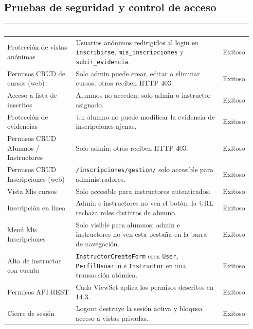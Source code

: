 \documentclass[11pt,letterpaper]{article}
\newcommand{\headrowcolor}{\rowcolor{azulUAZ}}
\newcommand{\headcell}[1]{\textcolor{white}{\textbf{#1}}}
\begin{document}
	\subsection{Pruebas de seguridad y control de acceso}
	\begin{center}\small
		\begin{tabularx}{\linewidth}{|p{4.2cm}|X|c|}
			\hline
			\headrowcolor \headcell{Caso} & \headcell{Resultado esperado} & \headcell{Estado} \\ \hline
			Protecci\'on de vistas an\'onimas & Usuarios an\'onimos redirigidos al login en \texttt{inscribirse}, \texttt{mis\_inscripciones} y \texttt{subir\_evidencia}. & Exitoso \\ \hline
			\rowcolor{grisAlt}
			Permisos CRUD de cursos (web) & Solo admin puede crear, editar o eliminar cursos; otros reciben HTTP 403. & Exitoso \\ \hline
			Acceso a lista de inscritos & Alumnos no acceden; solo admin o instructor asignado. & Exitoso \\ \hline
			\rowcolor{grisAlt}
			Protecci\'on de evidencias & Un alumno no puede modificar la evidencia de inscripciones ajenas. & Exitoso \\ \hline
			Permisos CRUD Alumnos / Instructores & Solo admin; otros reciben HTTP 403. & Exitoso \\ \hline
			\rowcolor{grisAlt}
			Permisos CRUD Inscripciones (web) & \texttt{/inscripciones/gestion/} solo accesible para administradores. & Exitoso \\ \hline
			Vista Mis cursos & Solo accesible para instructores autenticados. & Exitoso \\ \hline
			\rowcolor{grisAlt}
			Inscripci\'on en l\'inea & Admin e instructores no ven el bot\'on; la URL rechaza roles distintos de alumno. & Exitoso \\ \hline
			\rowcolor{grisAlt}
			Men\'u Mis Inscripciones & Solo visible para alumnos; admin e instructores no ven esta pesta\~na en la barra de navegaci\'on. & Exitoso \\ \hline
			Alta de instructor con cuenta & \texttt{InstructorCreateForm} crea \texttt{User}, \texttt{PerfilUsuario} e \texttt{Instructor} en una transacci\'on at\'omica. & Exitoso \\ \hline
			\rowcolor{grisAlt}
			Permisos API REST & Cada ViewSet aplica los permisos descritos en 14.3. & Exitoso \\ \hline
			Cierre de sesi\'on & Logout destruye la sesi\'on activa y bloquea acceso a vistas privadas. & Exitoso \\ \hline
		\end{tabularx}
	\end{center}
	
\end{document}
